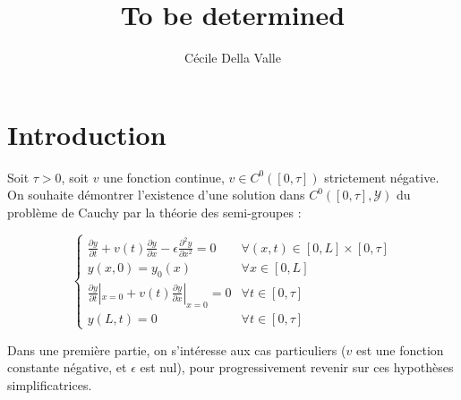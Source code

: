 \documentclass[a4paper]{article}
\title{To be determined}
\author{Cécile Della Valle}
\begin{document}
\maketitle

\section{Introduction}

Soit $\tau>0$,
soit $v$ une fonction continue, $v \in C^0([0,\tau])$ strictement négative.
On souhaite démontrer l'existence d'une solution dans $C^0([0,\tau],\mathscr{Y})$ du problème de Cauchy par la théorie des semi-groupes :

\begin{equation}
\label{eq:general}
\begin{cases}
 \displaystyle \frac{\partial y}{\partial t}
 + v(t) \frac{\partial y} {\partial x}  
 - \epsilon \frac{\partial^2 y} {\partial x^2}
 = 0  & \forall (x,t) \in [0,L] \times [0, \tau]\\
 y(x,0) = y_{0} (x) & \forall x \in [0,L] \\
 \displaystyle \frac{\partial y}{\partial t}|_{x=0}
 + v(t) \frac{\partial y} {\partial x}|_{x=0} = 0 & \forall t \in [0,\tau]\\
 y(L,t) = 0 & \forall t \in [0,\tau]
\end{cases}
\end{equation}

Dans une première partie, on s'intéresse aux cas particuliers ($v$ est une fonction constante négative, et $\epsilon$ est nul), pour progressivement revenir sur ces hypothèses simplificatrices.
\end{document}
